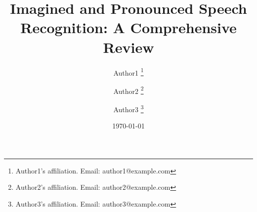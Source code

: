\title{Imagined and Pronounced Speech Recognition: A Comprehensive Review}
\author{
	Author1 \thanks{Author1's affiliation. Email: author1@example.com} \and
	Author2 \thanks{Author2's affiliation. Email: author2@example.com} \and
	Author3 \thanks{Author3's affiliation. Email: author3@example.com}}
\date{\today}
